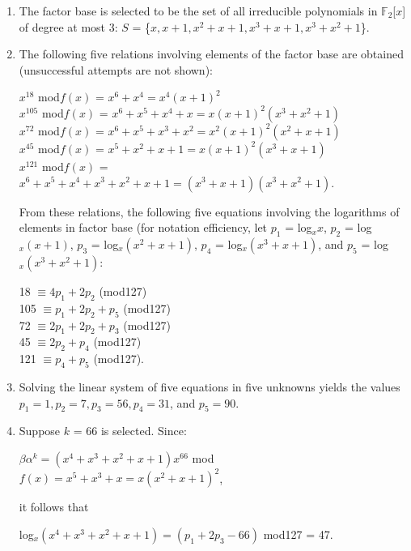 \documentclass[iwp,first]{luthesis}
\begin{document}
\begin{enumerate}

\item The factor base is selected to be the set of all irreducible polynomials in $\mathbb{F}_2$[$x$] of degree at most 3: $S$ = \{$x, x+1, x^2+x+1, x^3+x+1, x^3+x^2+1$\}.

\item The following five relations involving elements of the factor base are obtained (unsuccessful attempts are not shown):

\begin{center}

$x^{18}$ mod$f(x)$ = $x^6+x^4 = x^4(x+1)^2$
\\
$x^{105}$ mod$f(x)$ = $x^6+x^5+x^4+x = x(x+1)^2(x^3+x^2+1)$
\\
$x^{72}$ mod$f(x)$ = $x^6+x^5+x^3+x^2 = x^2(x+1)^2(x^2+x+1)$
\\
$x^{45}$ mod$f(x)$ = $x^5+x^2+x+1 = x(x+1)^2(x^3+x+1)$
\\
$x^{121}$ mod$f(x)$ = $x^6+x^5+x^4+x^3+x^2+x+1 = (x^3+x+1)(x^3+x^2+1)$.

\end{center}

From these relations, the following five equations involving the logarithms of elements in factor base (for notation efficiency, let $p_1$ = log$_{x}x$, $p_2$ = log$_x(x+1)$, $p_3$ = log$_{x}(x^2+x+1)$, $p_4$ = log$_{x}(x^3+x+1)$, and $p_5$ = log$_{x}(x^3+x^2+1)$:

\begin{center}

18 $\equiv 4p_1+2p_2$  (mod127)
\\
105 $\equiv p_1+2p_2+p_5$ (mod127)
\\
72 $\equiv 2p_1+2p_2+p_3$ (mod127)
\\
45 $\equiv 2p_2+p_4$ (mod127)
\\
121 $\equiv p_4+p_5$ (mod127).

\end{center}

\item Solving the linear system of five equations in five unknowns yields the values $p_1 = 1, p_2 =7, p_3 =56, p_4 = 31$, and $p_5 = 90$.

\item Suppose $k$ = 66 is selected. Since:

\begin{center}
$\beta\alpha^k = (x^4+x^3+x^2+x+1)x^{66}$ mod$f(x) = x^5+x^3+x = x(x^2+x+1)^2$,
\end{center}

it follows that

\begin{center}
log$_{x}(x^4+x^3+x^2+x+1) = (p_1+2p_3-66)$ mod127 = 47.
\end{center}
\end{enumerate}
\end{document}
